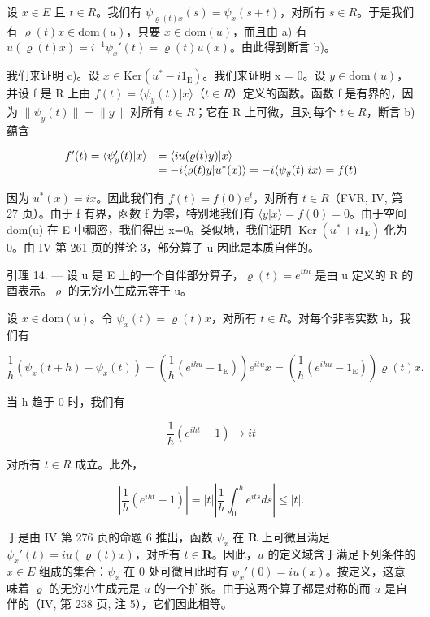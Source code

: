 设 \(x \in E\) 且 \(t \in R\)。我们有 \(\psi_{\varrho(t)x}(s) = \psi_x(s + t)\)，对所有 \(s \in R\)。于是我们有 \(\varrho(t)x \in \text{dom}(u)\)，只要 \(x \in \text{dom}(u)\)，而且由 a) 有 \(u(\varrho(t)x) = i^{-1}\psi_x'(t) = \varrho(t)u(x)\)。由此得到断言 b)。

我们来证明 c)。设 \(x \in \text{Ker}(u^{*} - i1_{\text{E}})\)。我们来证明 x = 0。设 \(y \in \text{dom}(u)\)，并设 f 是 R 上由 \(f(t) = \langle \psi_{y}(t) | x \rangle\)（\(t \in R\)）定义的函数。函数 f 是有界的，因为 \(\| \psi_{y}(t) \| = \| y \|\) 对所有 \(t \in R\)；它在 R 上可微，且对每个 \(t \in R\)，断言 b) 蕴含

\[
\begin{array}{r l} f ^ {\prime} (t) = \langle \psi_ {y} ^ {\prime} (t) | x \rangle & = \langle i u (\varrho (t) y) | x \rangle \\ & = - i \langle \varrho (t) y | u ^ {*} (x) \rangle = - i \langle \psi_ {y} (t) | i x \rangle = f (t) \end{array}
\]

因为 \(u^{*}(x)=ix\)。因此我们有 \(f(t)=f(0)e^{t}\)，对所有 \(t\in R\)（FVR, IV, 第 27 页）。由于 f 有界，函数 f 为零，特别地我们有 \(\langle y|x\rangle=f(0)=0\)。由于空间 dom(u) 在 E 中稠密，我们得出 x=0。类似地，我们证明 \(\operatorname{Ker}(u^{*}+i1_{\mathrm{E}})\) 化为 0。由 IV 第 261 页的推论 3，部分算子 u 因此是本质自伴的。

引理 14. --- 设 u 是 E 上的一个自伴部分算子，\(\varrho(t) = e^{itu}\) 是由 u 定义的 R 的酉表示。\(\varrho\) 的无穷小生成元等于 u。

设 \(x \in \text{dom}(u)\)。令 \(\psi_{x}(t) = \varrho(t)x\)，对所有 \(t \in R\)。对每个非零实数 h，我们有

\[
\frac {1}{h} \left(\psi_ {x} (t + h) - \psi_ {x} (t)\right) = \left(\frac {1}{h} \left(e ^ {i h u} - 1 _ {\mathrm{E}}\right)\right) e ^ {i t u} x = \left(\frac {1}{h} \left(e ^ {i h u} - 1 _ {\mathrm{E}}\right)\right) \varrho (t) x.
\]

当 h 趋于 0 时，我们有

\[
\frac {1}{h} (e ^ {i h t} - 1) \rightarrow i t
\]

对所有 \(t \in R\) 成立。此外，

\[
\left| \frac {1}{h} (e ^ {i h t} - 1) \right| = | t | \left| \frac {1}{h} \int_ {0} ^ {h} e ^ {i t s} d s \right| \leqslant | t |.
\]

于是由 IV 第 276 页的命题 6 推出，函数 \(\psi_x\) 在 \(\mathbf{R}\) 上可微且满足 \(\psi_x'(t) = i u(\varrho(t)x)\)，对所有 \(t \in \mathbf{R}\)。因此，\(u\) 的定义域含于满足下列条件的 \(x \in E\) 组成的集合：\(\psi_x\) 在 0 处可微且此时有 \(\psi_x'(0) = i u(x)\)。按定义，这意味着 \(\varrho\) 的无穷小生成元是 \(u\) 的一个扩张。由于这两个算子都是对称的而 \(u\) 是自伴的（IV, 第 238 页, 注 5），它们因此相等。


